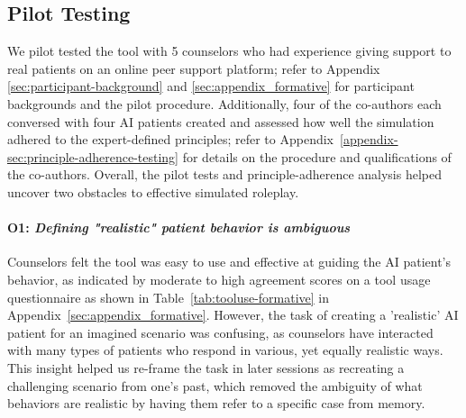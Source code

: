 \documentclass[11pt]{article}
\newcommand{\raj}[1]{\ifthenelse{\boolean{showcomments}}{\textcolor{purple}{[#1 —raj]}}{}}
\begin{document}
\subsection{Pilot Testing} \label{sec:formative-tests}

We pilot tested the tool with 5 counselors who had experience giving support to real patients on an online peer support platform; refer to Appendix \ref{sec:participant-background} and \ref{sec:appendix_formative} for participant backgrounds and the pilot procedure. 
Additionally, four of the co-authors each conversed with four AI patients created and assessed how well the simulation adhered to the expert-defined principles; refer to Appendix~\ref{appendix-sec:principle-adherence-testing} for details on the procedure and qualifications of the co-authors. Overall, the pilot tests and principle-adherence analysis helped uncover two obstacles to effective simulated roleplay. 

\paragraph{O1: \textit{Defining "realistic" patient behavior is ambiguous}} \label{sec:pilot-o1} 
Counselors felt the tool was easy to use and effective at guiding the AI patient's behavior, as indicated by moderate to high agreement scores on a tool usage questionnaire as shown in Table~\ref{tab:tooluse-formative} in Appendix~\ref{sec:appendix_formative}. %
However, the task of creating a 'realistic' AI patient for an imagined scenario was confusing, as counselors have interacted with many types of patients who respond in various, yet equally realistic ways. 
This insight helped us re-frame the task in later sessions as recreating a challenging scenario from one's past, which removed the ambiguity of what behaviors are realistic by having them refer to a specific case from memory. 
\end{document}
